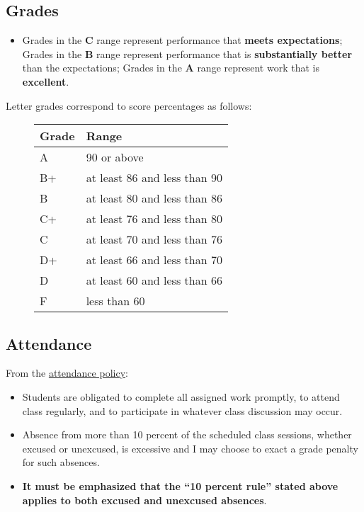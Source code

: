 \documentclass[11pt]{article}
\begin{document}
\subsection{Grades}
\begin{itemize}
  \item
    Grades in the \textbf{C} range represent performance
    that \textbf{meets expectations}; Grades in the
    \textbf{B} range represent performance that is
    \textbf{substantially better} than the expectations;
    Grades in the \textbf{A} range represent work that is
    \textbf{excellent}.
\end{itemize}
Letter grades correspond to score percentages as follows:
\begin{figure}[H]
  \centering
  \begin{tabular}{l l}
    \toprule
    Grade & Range                        \\
    \midrule
    A     & 90 or above                  \\
    B+    & at least 86 and less than 90 \\
    B     & at least 80 and less than 86 \\
    C+    & at least 76 and less than 80 \\
    C     & at least 70 and less than 76 \\
    D+    & at least 66 and less than 70 \\
    D     & at least 60 and less than 66 \\
    F     & less than 60                 \\
    \bottomrule
  \end{tabular}
\end{figure}

\subsection{Attendance}
From the
\href{http://bulletin.sc.edu/content.php?catoid=52&navoid=1280#Attendance_Policy}{attendance
policy}:
\begin{itemize}
  \item Students are obligated to complete all assigned
    work promptly, to attend class regularly, and to
    participate in whatever class discussion may occur.
  \item
    Absence from more than 10 percent of the scheduled class
    sessions, whether excused or unexcused, is excessive and
    I may choose to exact a grade penalty for
    such absences.
  \item
    \textbf{It must be emphasized that the ``10 percent rule''
      stated above applies to both excused and unexcused
    absences}.
\end{itemize}
\end{document}
